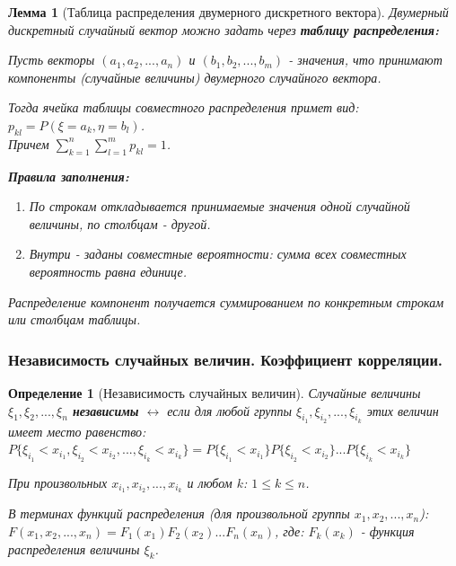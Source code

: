\documentclass[14pt]{extarticle}
\theoremstyle{breakstyle}
\newtheorem{definition}{Определение}[subsection]
\newtheorem{lemma}{Лемма}[subsection]
\begin{document}
\begin{lemma}[Таблица распределения двумерного дискретного вектора]

Двумерный дискретный случайный вектор можно задать через \textbf{таблицу распределения:}

\vspace{\baselineskip}

Пусть векторы $(a_{1}, a_{2}, ..., a_{n})$ и $(b_{1}, b_{2}, ..., b_{m})$ - значения, что принимают компоненты (случайные величины) двумерного случайного вектора.

\vspace{\baselineskip}

Тогда ячейка таблицы совместного распределения примет вид: $p_{kl} = P(\xi = a_{k}, \eta = b_{l})$. \\
Причем $\sum_{k=1}^{n} \sum_{l=1}^{m} p_{kl} = 1$.

\vspace{\baselineskip}

\textbf{Правила заполнения:}
\begin{enumerate}
    \item По строкам откладывается принимаемые значения одной случайной величины, по столбцам - другой.
    \item Внутри - заданы совместные вероятности: сумма всех совместных вероятность равна единице.
\end{enumerate}

\vspace{\baselineskip}

Распределение компонент получается суммированием по конкретным строкам или столбцам таблицы.

\end{lemma}

\subsubsection{Независимость случайных величин. Коэффициент корреляции.}
\begin{definition}[Независимость случайных величин]

Случайные величины $\xi_{1}, \xi_{2}, ..., \xi_{n}$ \textbf{независимы} $\leftrightarrow$ если для любой группы $\xi_{i_{1}}, \xi_{i_{2}}, ..., \xi_{i_{k}}$ этих величин имеет место равенство:\\
$P\{\xi_{i_{1}} < x_{i_{1}}, \xi_{i_{2}} < x_{i_{2}}, ..., \xi_{i_{k}} < x_{i_{k}}\} = P\{\xi_{i_{1}} < x_{i_{1}}\}P\{\xi_{i_{2}} < x_{i_{2}}\}...P\{\xi_{i_{k}} < x_{i_{k}}\}$

\vspace{\baselineskip}

При произвольных $x_{i_{1}}, x_{i_{2}}, ..., x_{i_{k}}$ и любом $k$: $1 \leq k \leq n$.

\vspace{\baselineskip}

В терминах функций распределения (для произвольной группы $x_{1}, x_{2}, ..., x_{n}$):\\
$F(x_{1}, x_{2}, ..., x_{n}) = F_{1}(x_{1})F_{2}(x_{2})...F_{n}(x_{n})$, где: $F_{k}(x_{k})$ - функция распределения величины $\xi_{k}$.

\end{definition}
\end{document}
